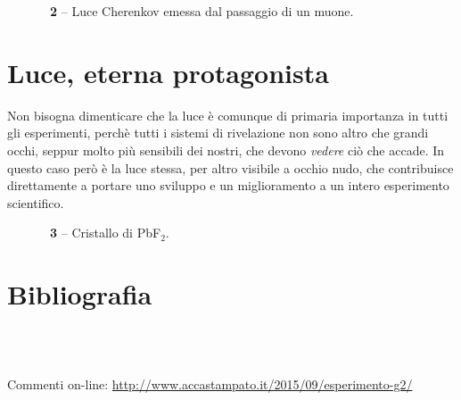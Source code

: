 \begin{figure}[!b]
\begin{center}
\caption{\textbf{\figurename~2} -- Luce Cherenkov emessa dal passaggio di un muone.}
\label{fig:cherenkov}
\end{center}
\vskip-20pt
\end{figure}

\section*{Luce, eterna protagonista}
Non bisogna dimenticare che la luce è comunque di primaria importanza in tutti gli esperimenti, perchè tutti i sistemi di rivelazione non sono altro che grandi occhi, seppur molto più sensibili dei nostri, che devono \emph{vedere} ciò che accade. In questo caso però è la luce stessa, per altro visibile a occhio nudo, che contribuisce direttamente a portare uno sviluppo e un miglioramento a un intero esperimento scientifico.

\begin{figure}[!t]
\begin{center}
\caption{\textbf{\figurename~3} -- Cristallo di PbF$_2$.}
\label{fig:PbF2}
\end{center}
\vskip-20pt
\end{figure}

\section*{Bibliografia}
\\
\\

\smallskip
Commenti on-line: \url{http://www.accastampato.it/2015/09/esperimento-g2/}
